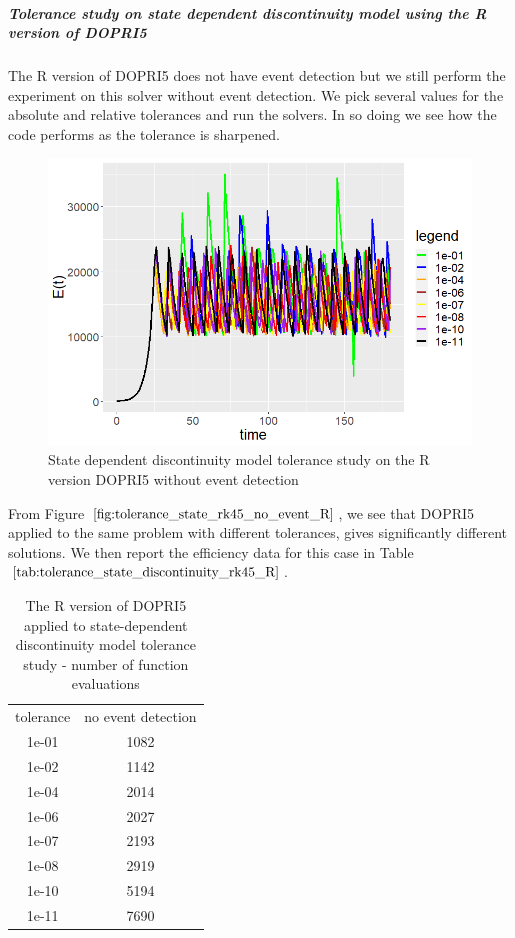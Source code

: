 \subparagraph{Tolerance study on state dependent discontinuity model using the R version of DOPRI5}
The R version of DOPRI5 does not have event detection but we still perform the experiment on this solver without event detection. We pick several values for the absolute and relative tolerances and run the solvers. In so doing we see how the code performs as the tolerance is sharpened. 

\begin{figure}[h]
\centering
\includegraphics[width=0.7\linewidth]{./figures/tolerance_state_rk45_no_event_R}
\caption{State dependent discontinuity model tolerance study on the R version DOPRI5 without event detection}
\label{fig:tolerance_state_rk45_no_event_R}
\end{figure}

From Figure $\ref{fig:tolerance_state_rk45_no_event_R}$, we see that DOPRI5 applied to the same problem with different tolerances, gives significantly different solutions. We then report the efficiency data for this case in Table $\ref{tab:tolerance_state_discontinuity_rk45_R}$.

\begin{table}[h]
\caption {The R version of DOPRI5 applied to state-dependent discontinuity model tolerance study - number of function evaluations} \label{tab:tolerance_state_discontinuity_rk45_R} 
\begin{center}
\begin{tabular}{ c c }
tolerance & no event detection \\
1e-01 & 1082 \\
1e-02 & 1142 \\
1e-04 & 2014 \\
1e-06 & 2027 \\
1e-07 & 2193 \\
1e-08 & 2919 \\
1e-10 & 5194 \\
1e-11 & 7690 \\
\end{tabular}
\end{center}
\end{table}

